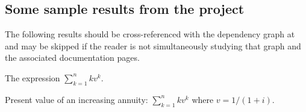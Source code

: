 %

\subsection{Some sample results from the project}

The following results should be cross-referenced with the dependency graph at \cite{interest} and may
be skipped if the reader is not simultaneously studying that graph and the associated documentation pages.
%



\begin{definition}\label{id_mul_geom_sum}
	\leanok
	The expression $\sum_{k=1}^n k v^k$.
\end{definition}


\begin{definition}[\texttt{Ia}]\label{Ia}
	\leanok
	Present value of an increasing annuity: $\sum_{k=1}^n k v^k$
	where $v=1/(1+i)$.
\end{definition}

